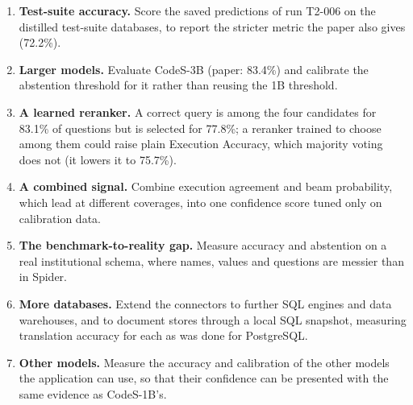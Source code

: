 \begin{enumerate}
	\item \textbf{Test-suite accuracy.} Score the saved predictions of run T2-006 on the distilled test-suite databases, to report the stricter metric the paper also gives (72.2\%).
	\item \textbf{Larger models.} Evaluate CodeS-3B (paper: 83.4\%) and calibrate the abstention threshold for it rather than reusing the 1B threshold.
	\item \textbf{A learned reranker.} A correct query is among the four candidates for 83.1\% of questions but is selected for 77.8\%; a reranker trained to choose among them could raise plain Execution Accuracy, which majority voting does not (it lowers it to 75.7\%).
	\item \textbf{A combined signal.} Combine execution agreement and beam probability, which lead at different coverages, into one confidence score tuned only on calibration data.
	\item \textbf{The benchmark-to-reality gap.} Measure accuracy and abstention on a real institutional schema, where names, values and questions are messier than in Spider.
	\item \textbf{More databases.} Extend the connectors to further SQL engines and data warehouses, and to document stores through a local SQL snapshot, measuring translation accuracy for each as was done for PostgreSQL.
	\item \textbf{Other models.} Measure the accuracy and calibration of the other models the application can use, so that their confidence can be presented with the same evidence as CodeS-1B's.
\end{enumerate}
